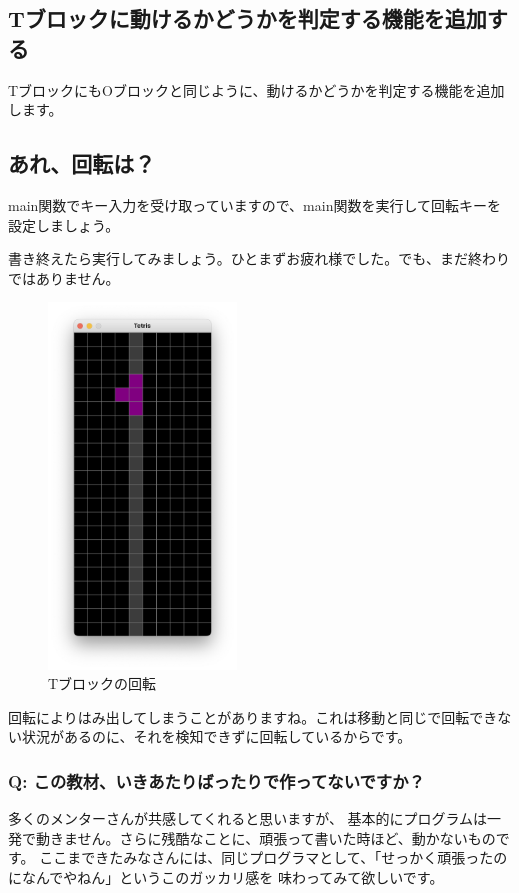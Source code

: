 \subsection{Tブロックに動けるかどうかを判定する機能を追加する}
TブロックにもOブロックと同じように、動けるかどうかを判定する機能を追加します。


\subsection{あれ、回転は？}
main関数でキー入力を受け取っていますので、main関数を実行して回転キーを設定しましょう。


書き終えたら実行してみましょう。ひとまずお疲れ様でした。でも、まだ終わりではありません。
\begin{figure}[h]
  \centering
  \includegraphics[width=50mm]{images/CH7_4.png}
  \caption{Tブロックの回転}
\end{figure}

回転によりはみ出してしまうことがありますね。これは移動と同じで回転できない状況があるのに、それを検知できずに回転しているからです。

\subsubsection{Q: この教材、いきあたりばったりで作ってないですか？}
多くのメンターさんが共感してくれると思いますが、
基本的にプログラムは一発で動きません。さらに残酷なことに、頑張って書いた時ほど、動かないものです。
ここまできたみなさんには、同じプログラマとして、「せっかく頑張ったのになんでやねん」というこのガッカリ感を
味わってみて欲しいです。


